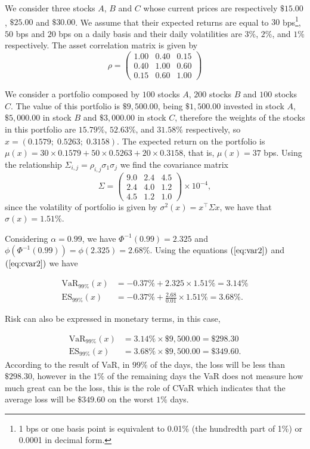 \begin{example}\normalfont
	We consider three stocks $A$, $B$ and $C$ whose current prices are respectively $\$ 15.00$, $\$ 25.00$ and $\$ 30.00$. We assume that their expected returns are equal to $30$ bps\footnote{1 bps or one basis point is equivalent to
		0.01\% (the hundredth part of 1\%) or 0.0001 in decimal form.}, $50$ bps and $20$ bps on a daily basis and their daily volatilities are $3\%$, $2\%$, and $1\%$ respectively. The asset correlation matrix is given by
	\[
		\rho = \left(
		\begin{array}{rrr}
				1.00 & 0.40 & 0.15 \\
				0.40 & 1.00 & 0.60 \\
				0.15 & 0.60 & 1.00
			\end{array}
		\right)
	\]

	We consider a portfolio composed by $100$ stocks $A$, $200$ stocks $B$ and $100$ stocks $C$. The value of this portfolio is $\$ 9,500.00$, being $\$ 1,500.00$ invested in stock $A$, $\$ 5,000.00$ in stock $B$ and $\$ 3,000.00$ in stock $C$, therefore the weights of the stocks in this portfolio are $15.79\%$, $52.63\%$, and $31.58\%$ respectively, so $x=(0.1579;\;0.5263;\; 0.3158)$. The expected return on the portfolio is $\mu(x) = 30\times0.1579+50\times0.5263+20\times0.3158$, that is, $\mu(x) = 37$ bps. Using the relationship $\Sigma_{i,j}=\rho_{i,j}\sigma_1\sigma_j$ we find the covariance matrix
	\[
		\Sigma = \left(
		\begin{array}{llr}
				9.0 & 2.4 & 4.5 \\
				2.4 & 4.0 & 1.2 \\
				4.5 & 1.2 & 1.0
			\end{array}
		\right)\times10^{-4},
	\] since the volatility of portfolio is given by $\sigma^2(x) = x^\top \Sigma x$, we have that $\sigma(x) = 1.51\%$.

	Considering $\alpha = 0.99$, we have $\Phi^{-1}(0.99) = 2.325$ and
	$\phi(\Phi^{-1}(0.99))=\phi(2.325)=2.68\%$. Using the equations
	$(\ref{eq:var2})$ and $(\ref{eq:cvar2})$ we have

	\[
		\begin{aligned}
			\mathrm{VaR}_{99\%}(x) & = -0.37\% + 2.325 \times 1.51\% = 3.14\%              \\
			\mathrm{ES}_{99\%}(x)  & = -0.37\% + \frac{2.68}{0.01} \times 1.51\% = 3.68\%.
		\end{aligned}
	\]

	Risk can also be expressed in monetary terms, in this case,

	\[
		\begin{aligned}
			\mathrm{VaR}_{99\%}(x) & = 3.14\% \times \$ 9,500.00 = \$ 298.30  \\
			\mathrm{ES}_{99\%}(x)  & = 3.68\% \times \$ 9,500.00 = \$ 349.60.
		\end{aligned}
	\]
	According to the result of {\rm VaR}, in $99\%$ of the days, the loss will be less than $\$ 298.30$, however in the $1\%$ of the remaining days the {\rm VaR} does not measure how much great can be the loss, this is the role of {\rm CVaR} which indicates that the average loss will be $\$ 349.60$ on the worst $1\%$ days.
\end{example}
